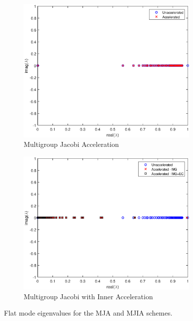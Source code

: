 \begin{figure}
\centering
	\begin{subfigure}[b]{0.775\textwidth}
		\centering
		\includegraphics[width=0.975\textwidth]{figures/sec_DSA/IM1_Graph_FA_MJA.eps}
		\caption{Multigroup Jacobi Acceleration}
	\end{subfigure}
	
	\begin{subfigure}[b]{0.775\textwidth}
		\centering
		\includegraphics[width=0.975\textwidth]{figures/sec_DSA/IM1_Graph_FA_MJIA.eps}
		\caption{Multigroup Jacobi with Inner Acceleration}
	\end{subfigure}
\caption{Flat mode eigenvalues for the MJA and MJIA schemes.}
\label{fig::IM1_Flat_FA_MJAandMJIA}
\end{figure}


